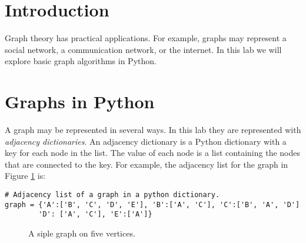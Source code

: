 \label{lab:SixDegreesKevinBacon}


\section*{Introduction}

Graph theory has practical applications.
For example, graphs may represent a social network, a communication network, or the internet.
In this lab we will explore basic graph algorithms in Python.

\section*{Graphs in Python}

A graph may be represented in several ways.
In this lab they are represented with \emph{adjacency dictionaries}.
An adjacency dictionary is a Python dictionary with a key for each node in the list.
The value of each node is a list containing the nodes that are connected to the key.
For example, the adjacency list for the graph in Figure \ref{fig:simple_graph} is:

\begin{lstlisting}
# Adjacency list of a graph in a python dictionary.
graph = {'A':['B', 'C', 'D', 'E'], 'B':['A', 'C'], 'C':['B', 'A', 'D']
		'D': ['A', 'C'], 'E':['A']}
\end{lstlisting}

\begin{figure}
\centering
{}
\caption{A siple graph on five vertices.  }
\label{fig:simple_graph}
\end{figure}


